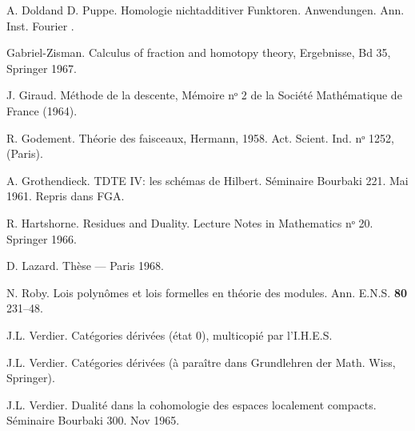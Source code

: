 \begin{thebibliography}{}
 A. Dold\pageoriginale  and D. Puppe. Homologie nicht\sisi{ }{-}additiver
Funktoren. Anwendungen. Ann. Inst. Fourier .

 Gabriel-Zisman. Calculus of fraction and homotopy
theory, Ergebnisse, Bd 35, Springer 1967.

 J. Giraud. Méthode de la descente, Mémoire nᵒ 2 de la Société Mathématique de France (1964).

 R. Godement. Théorie des faisceaux, Hermann,
1958. Act. Scient. Ind. nᵒ 1252, (Paris).

 A. Grothendieck. TDTE IV: les schémas de
Hilbert. Séminaire Bourbaki 221. Mai 1961. Repris dans FGA.

 R. Hartshorne. Residues and Duality. Lecture Notes
in Mathematics nᵒ 20. Springer 1966.

 D. Lazard. Thèse --- Paris 1968.



 N. Roby. Lois polynômes et lois formelles en théorie
des modules. Ann. E.N.S. \textbf{80} 231--48.

 J.L. Verdier. Catégories dérivées (état 0),
multicopié par l'I.H.E.S.

 J.L. Verdier. Catégories dérivées (à paraître dans
Grundlehren der Math. Wiss, Springer).

 J.L. Verdier. Dualité dans la cohomologie des
espaces localement compacts. Séminaire Bourbaki 300. Nov 1965.
\end{thebibliography}




\ifx\danslelivre\undefined

\fi
